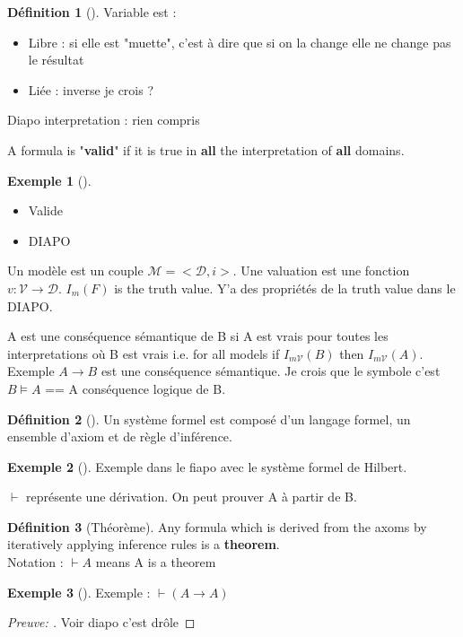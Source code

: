 \documentclass{article}
\theoremstyle{plain}%
\theoremstyle{definition}
\newtheorem{defn}{Définition}[section]
\newtheorem{exmp}{Exemple}[section]
\theoremstyle{remark}
\begin{document}
\begin{defn}[]
    Variable est : \begin{itemize}
        \item Libre : si elle est "muette", c'est à dire que si on la change elle ne change pas le résultat
        \item Liée : inverse je crois ?
    \end{itemize}

    Diapo interpretation : rien compris

    A formula is "\textbf{valid}" if it is true in \textbf{all} the interpretation of \textbf{all} domains.
    \begin{exmp}[]
        \begin{itemize}
            \item Valide 
            \item DIAPO
        \end{itemize}
    \end{exmp}
    
    Un modèle est un couple $ \mathcal{M} = < \mathcal{D},i> $. Une valuation est une fonction $ v:\mathcal{V} \rightarrow  \mathcal{D} $. $ I_m(F) $ is the truth value. Y'a des propriétés de la truth value dans le DIAPO.

    A est une conséquence sémantique de B si A est vrais pour toutes les interpretations où B est vrais i.e. for all models if $ I_{m \mathcal{V}}(B) $ then $ I_{m \mathcal{V}}(A) $. Exemple $ A \rightarrow B $  est une conséquence sémantique. Je crois que le symbole c'est $ B \models A $ == A conséquence logique de B. 
\end{defn}

\begin{defn}[]
    Un système formel est composé d'un langage formel, un ensemble d'axiom et de règle d'inférence.

    \begin{exmp}[]
        Exemple dans le fiapo avec le système formel de Hilbert. 

        $ \vdash  $ représente une dérivation. On peut prouver A à partir de B.
    \end{exmp}
\end{defn}

\begin{defn}[Théorème]
    Any formula which is derived from the axoms by iteratively applying inference rules is a \textbf{theorem}.\\
    Notation : $ \vdash A $ means A is a theorem \\
    \begin{exmp}[]
        Exemple : $ \vdash (A \rightarrow A) $ 
        \begin{proof}[Preuve: ]
            Voir diapo c'est drôle
        \end{proof}
    \end{exmp}
\end{defn}
\end{document}
